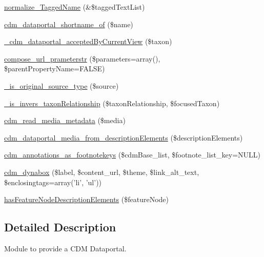 \begin{DoxyCompactItemize}
\item 
\hyperlink{cdm__dataportal_8module_a55cec6c34e6b20f0efb75d95e4e58e17}{normalize\-\_\-\-Tagged\-Name} (\&\$tagged\-Text\-List)
\item 
\hyperlink{cdm__dataportal_8module_a7500549750ac7c945cb026c51d5d8e5f}{cdm\-\_\-dataportal\-\_\-shortname\-\_\-of} (\$name)
\item 
\hyperlink{cdm__dataportal_8module_a9e7d3abf796df4c05ae16a9abd4356e9}{\-\_\-cdm\-\_\-dataportal\-\_\-accepted\-By\-Current\-View} (\$taxon)
\item 
\hyperlink{cdm__dataportal_8module_a126f75b7af0b1bb35a61e0c311444882}{compose\-\_\-url\-\_\-prameterstr} (\$parameters=array(), \$parent\-Property\-Name=F\-A\-L\-S\-E)
\item 
\hyperlink{cdm__dataportal_8module_a1ebeb316dc54412757883964cec8724d}{\-\_\-is\-\_\-original\-\_\-source\-\_\-type} (\$source)
\item 
\hyperlink{cdm__dataportal_8module_a0a65c3560af340187b85353dca737351}{\-\_\-is\-\_\-invers\-\_\-taxon\-Relationship} (\$taxon\-Relationship, \$focused\-Taxon)
\item 
\hyperlink{cdm__dataportal_8module_a5a98acc9275f42c9e3961a7ce611497b}{cdm\-\_\-read\-\_\-media\-\_\-metadata} (\$media)
\item 
\hyperlink{cdm__dataportal_8module_ab5bd36fb1a6beeffa7acc300720f18ab}{cdm\-\_\-dataportal\-\_\-media\-\_\-from\-\_\-description\-Elements} (\$description\-Elements)
\item 
\hyperlink{cdm__dataportal_8module_a9f46336913dc5a5dd7914d66ed840f40}{cdm\-\_\-annotations\-\_\-as\-\_\-footnotekeys} (\$cdm\-Base\-\_\-list, \$footnote\-\_\-list\-\_\-key=N\-U\-L\-L)
\item 
\hyperlink{cdm__dataportal_8module_a95898a7b842d2909abdfa92066818d34}{cdm\-\_\-dynabox} (\$label, \$content\-\_\-url, \$theme, \$link\-\_\-alt\-\_\-text, \$enclosingtags=array('li', 'ul'))
\item 
\hyperlink{cdm__dataportal_8module_aecfae2c17d781991784e5b3f80d7c802}{has\-Feature\-Node\-Description\-Elements} (\$feature\-Node)
\end{DoxyCompactItemize}


\subsection{Detailed Description}
Module to provide a C\-D\-M Dataportal.


